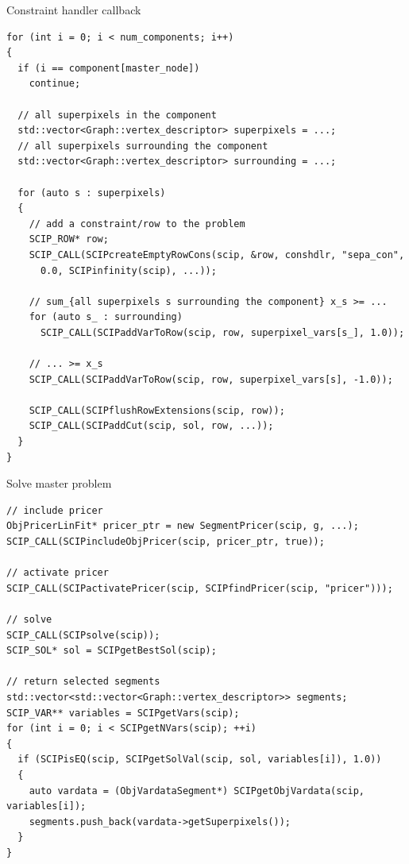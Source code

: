 \documentclass[fleqn]{beamer}
\begin{document}
\begin{frame}[fragile]{Constraint handler callback}
\begin{verbatim}
for (int i = 0; i < num_components; i++)
{
  if (i == component[master_node])
    continue;
    
  // all superpixels in the component
  std::vector<Graph::vertex_descriptor> superpixels = ...;
  // all superpixels surrounding the component
  std::vector<Graph::vertex_descriptor> surrounding = ...;
  
  for (auto s : superpixels)
  {
    // add a constraint/row to the problem
    SCIP_ROW* row;
    SCIP_CALL(SCIPcreateEmptyRowCons(scip, &row, conshdlr, "sepa_con",
      0.0, SCIPinfinity(scip), ...));

    // sum_{all superpixels s surrounding the component} x_s >= ...
    for (auto s_ : surrounding)
      SCIP_CALL(SCIPaddVarToRow(scip, row, superpixel_vars[s_], 1.0));

    // ... >= x_s
    SCIP_CALL(SCIPaddVarToRow(scip, row, superpixel_vars[s], -1.0));

    SCIP_CALL(SCIPflushRowExtensions(scip, row));
    SCIP_CALL(SCIPaddCut(scip, sol, row, ...));
  }
}
\end{verbatim}
\end{frame}

\begin{frame}[fragile]{Solve master problem}
\begin{verbatim}
// include pricer 
ObjPricerLinFit* pricer_ptr = new SegmentPricer(scip, g, ...);
SCIP_CALL(SCIPincludeObjPricer(scip, pricer_ptr, true));

// activate pricer 
SCIP_CALL(SCIPactivatePricer(scip, SCIPfindPricer(scip, "pricer")));

// solve
SCIP_CALL(SCIPsolve(scip));
SCIP_SOL* sol = SCIPgetBestSol(scip);

// return selected segments
std::vector<std::vector<Graph::vertex_descriptor>> segments;
SCIP_VAR** variables = SCIPgetVars(scip);
for (int i = 0; i < SCIPgetNVars(scip); ++i)
{
  if (SCIPisEQ(scip, SCIPgetSolVal(scip, sol, variables[i]), 1.0))
  {
    auto vardata = (ObjVardataSegment*) SCIPgetObjVardata(scip, variables[i]);
    segments.push_back(vardata->getSuperpixels());
  }
}
\end{verbatim}
\end{frame}
        
\end{document}
